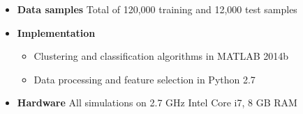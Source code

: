 \documentclass[a0]{a0poster}
\begin{document}
\begin{textblock}{7.0}
\begin{itemize}

    \item \textbf{Data samples} Total of 120,000 training and 12,000 test samples

    \item \textbf{Implementation} 
    \begin{itemize} 
      \item Clustering and classification algorithms in MATLAB 2014b
      \item Data processing and feature selection in Python 2.7
    \end{itemize}

    \item \textbf{Hardware} All simulations on 2.7 GHz Intel Core i7, 8 GB RAM

  \end{itemize}

\end{textblock}
\end{document}
